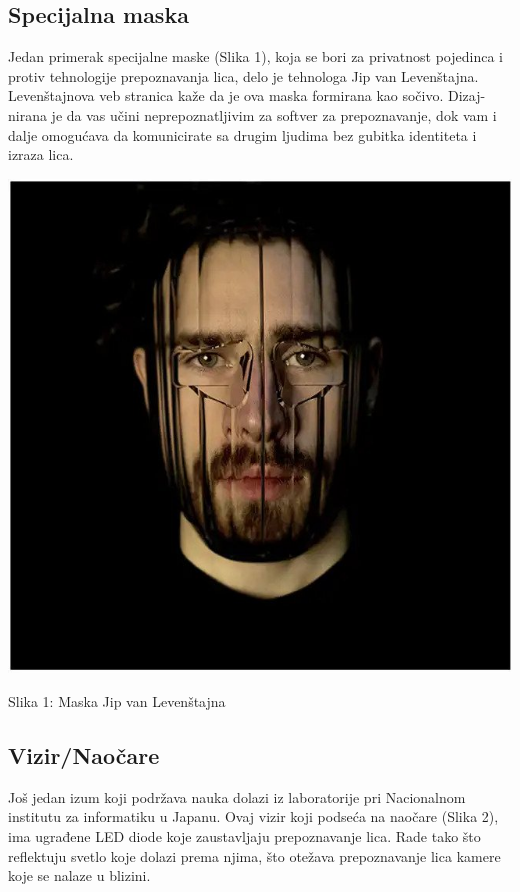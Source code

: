 \documentclass{article}
\begin{document}
\subsection{Specijalna maska}
Jedan primerak specijalne maske (Slika 1), koja se bori za privatnost pojedinca i protiv tehnologije prepoznavanja lica, delo je tehnologa Jip van Levenštajna. Levenštajnova veb stranica kaže da je ova maska formirana kao sočivo. Dizaj-nirana je da vas učini neprepoznatljivim za softver za prepoznavanje, dok vam i dalje omogućava da komunicirate sa drugim ljudima bez gubitka identiteta i izraza lica.\cite{treca}

\begin{center}
\begin{minipage}{0.5\textwidth}
\includegraphics[width=\textwidth]{slika.jpg}
\end{minipage}

\vspace{0.5cm}

Slika 1: Maska Jip van Levenštajna
\end{center}

\subsection{Vizir/Naočare}
Još jedan izum koji podržava nauka dolazi iz laboratorije pri Nacionalnom institutu za informatiku u Japanu. Ovaj vizir koji podseća na naočare (Slika 2), ima ugrađene LED diode koje zaustavljaju prepoznavanje lica. Rade tako što reflektuju svetlo koje dolazi prema njima, što otežava prepoznavanje lica kamere koje se nalaze u blizini. \cite{prva}
\end{document}
